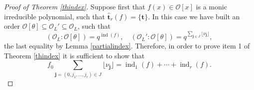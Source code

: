 \documentclass{amsart}
\def\op{\operatorname}
\def\ind{\op{ind}}
\def\j{\mathbf{j}}
\def\ol{{\mathcal O}_L}
\def\oo{{\mathcal O}}
\def\t{\theta}
\def\tt{\hat{\mathbf{t}}}
\def\ty{\mathbf{t}}
\def\zpx{\oo[x]}
\begin{document}
\begin{proof}[Proof of Theorem \ref{thindex}]
Suppose first that $f(x)\in\zpx$ is a monic irreducible polynomial, such that $\tt_r(f)=\{\ty\}$. In this case we have built an order $\oo[\t]\subseteq \ol'\subseteq \ol$, such that
\begin{equation}\label{end1}
\left(\ol\colon \oo[\t]\right)=q^{\ind(f)},\quad \left(\ol'\colon \oo[\t]\right)=q^{\sum_{\j\in J}\lfloor\nu_\j\rfloor},
\end{equation}
the last equality by Lemma \ref{partialindex}. Therefore, in order to prove item 1 of Theorem \ref{thindex} it is sufficient to show that
\begin{equation}\label{end2}
f_0\sum_{\j=(0,j_1,\dots,j_r)\in J}\lfloor\nu_\j\rfloor=\ind_1(f)+\cdots+\ind_r(f).
\end{equation}


\end{proof}
\end{document}
